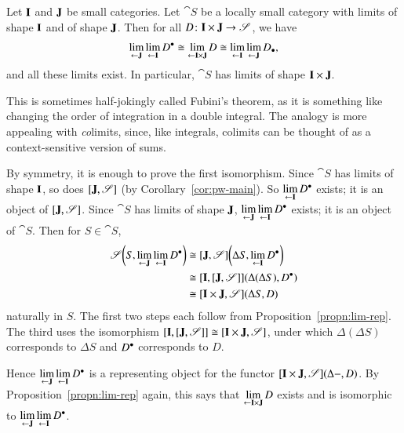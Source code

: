 \begin{propn}
\label{propn:lims-lims}
%
%
Let $\mathbf{I}$ and $\mathbf{J}$ be small categories.  Let $\cat{S}$ be a
locally small category with limits of shape $\mathbf{I}$ and of shape
$\mathbf{J}$.  Then for all $D\from \scat{I} \times \scat{J} \to \cat{S}$, we
have
\[
\lim\limits_{\leftarrow \mathbf{J}} \lim\limits_{\leftarrow \mathbf{I}} D^\bullet
\cong
\lim\limits_{\leftarrow \mathbf{I} \times \mathbf{J}} D
\cong
\lim\limits_{\leftarrow \mathbf{I}} \lim\limits_{\leftarrow \mathbf{J}} D_\bullet,
\]
and all these limits exist.  In particular, $\cat{S}$ has limits of shape
$\mathbf{I} \times \mathbf{J}$.
\end{propn}
%
This is sometimes half-jokingly called Fubini's%
%
%
theorem, as it is something like changing the order of integration in a
double integral.  The analogy is more appealing with \emph{co}limits,%
%
%
since, like integrals, colimits can be thought of as a context-sensitive
version of sums.

\begin{pf}
By symmetry, it is enough to prove the first isomorphism.  Since $\cat{S}$
has limits of shape $\mathbf{I}$, so does $[\mathbf{J},\mathscr{S}]$ (by
Corollary~\ref{cor:pw-main}).  So $\lim\limits_{\leftarrow \mathbf{I}} D^\bullet$ exists; it is an
object of $[\mathbf{J},\mathscr{S}]$.  Since $\cat{S}$ has limits of
shape $\mathbf{J}$, $\lim\limits_{\leftarrow \mathbf{J}} \lim\limits_{\leftarrow \mathbf{I}} D^\bullet$ exists; it is an
object of $\cat{S}$.  Then for $S \in \cat{S}$,
%
\begin{align*}
\mathscr{S}\biggl( S, \lim\limits_{\leftarrow \mathbf{J}} \lim\limits_{\leftarrow \mathbf{I}} D^\bullet \biggr)     &
\cong
[\mathbf{J},\mathscr{S}]
\biggl( \Delta S, \lim\limits_{\leftarrow \mathbf{I}} D^\bullet \biggr)                   \\
        &
\cong
[\mathbf{I},[\mathbf{J},\mathscr{S}]]
(\Delta (\Delta S), D^\bullet)                                      \\
        &
\cong
[\mathbf{I} \times \mathbf{J},\mathscr{S}] (\Delta S, D)
\end{align*}
%
naturally in $S$.  The first two steps each follow from
Proposition~\ref{propn:lim-rep}.  The third uses the isomorphism
$[\mathbf{I},[\mathbf{J},\mathscr{S}]] \cong [\mathbf{I} \times
\mathbf{J},\mathscr{S}]$, under which $\Delta(\Delta S)$ corresponds to $\Delta S$
and $D^\bullet$ corresponds to $D$.

Hence $\lim\limits_{\leftarrow \mathbf{J}} \lim\limits_{\leftarrow \mathbf{I}} D^\bullet$ is
a representing object for the functor $[\mathbf{I} \times
\mathbf{J},\mathscr{S}](\Delta-, D)$.  By Proposition~\ref{propn:lim-rep}
again, this says that $\lim\limits_{\leftarrow \mathbf{I} \times \mathbf{J}} D$ exists and is
isomorphic to $\lim\limits_{\leftarrow \mathbf{J}} \lim\limits_{\leftarrow \mathbf{I}} D^\bullet$.
\end{pf}

